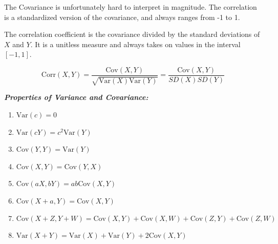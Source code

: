 \documentclass[
]{book}
\begin{document}
The Covariance is unfortunately hard to interpret in magnitude. The correlation is a standardized version of the covariance, and always ranges from -1 to 1.

\begin{definition}[Correlation]
\protect\hypertarget{def:unnamed-chunk-86}{}\label{def:unnamed-chunk-86}The correlation coefficient is the covariance divided by the standard deviations of \(X\) and \(Y\). It is a unitless measure and always takes on values in the interval \([-1,1]\).

\[\text{Corr}(X, Y) = \frac{\text{Cov}(X,Y)}{\sqrt{\text{Var}(X)\text{Var}(Y)}} = \frac{\text{Cov}(X,Y)}{SD(X)SD(Y)}\]
\end{definition}

\textbf{\emph{Properties of Variance and Covariance:}}

\begin{enumerate}
\def\labelenumi{\arabic{enumi}.}
\tightlist
\item
  \(\text{Var}(c) = 0\)
\item
  \(\text{Var}(cY) = c^2 \text{Var}(Y)\)
\item
  \(\text{Cov}(Y,Y) = \text{Var}(Y)\)
\item
  \(\text{Cov}(X,Y) = \text{Cov}(Y,X)\)
\item
  \(\text{Cov}(aX,bY) = ab \text{Cov}(X,Y)\)
\item
  \(\text{Cov}(X+a,Y) = \text{Cov}(X,Y)\)
\item
  \(\text{Cov}(X+Z,Y+W) = \text{Cov}(X,Y) + \text{Cov}(X,W) + \text{Cov}(Z,Y) + \text{Cov}(Z,W)\)
\item
  \(\text{Var}(X+Y) = \text{Var}(X) + \text{Var}(Y) + 2\text{Cov}(X,Y)\)
\end{enumerate}
\end{document}

